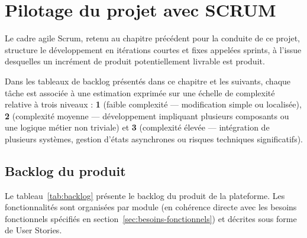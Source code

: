 \section{Pilotage du projet avec SCRUM}
\label{sec:scrum}

Le cadre agile Scrum, retenu au chapitre précédent pour la conduite de ce projet, structure le développement en itérations courtes et fixes appelées sprints, à l'issue desquelles un incrément de produit potentiellement livrable est produit.

Dans les tableaux de backlog présentés dans ce chapitre et les suivants, chaque tâche est associée à une estimation exprimée sur une échelle de complexité relative à trois niveaux : \textbf{1} (faible complexité — modification simple ou localisée), \textbf{2} (complexité moyenne — développement impliquant plusieurs composants ou une logique métier non triviale) et \textbf{3} (complexité élevée — intégration de plusieurs systèmes, gestion d'états asynchrones ou risques techniques significatifs).

\subsection{Backlog du produit}

Le tableau~\ref{tab:backlog} présente le backlog du produit de la plateforme. Les fonctionnalités sont organisées par module (en cohérence directe avec les besoins fonctionnels spécifiés en section~\ref{sec:besoins-fonctionnels}) et décrites sous forme de User Stories.

